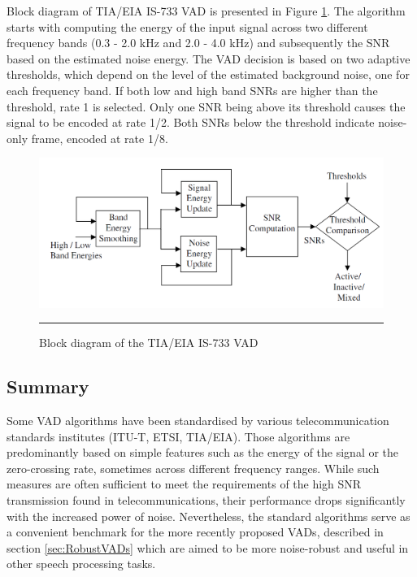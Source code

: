 Block diagram of TIA/EIA IS-733 VAD is presented in Figure \ref{fig:IS733}. The algorithm starts with computing the energy of the input signal across two different frequency bands (0.3 - 2.0 kHz and 2.0 - 4.0 kHz) and subsequently the SNR based on the estimated noise energy. The VAD decision is based on two adaptive thresholds, which depend on the level of the estimated background noise, one for each frequency band. If both low and high band SNRs are higher than the threshold, rate 1 is selected. Only one SNR being above its threshold causes the signal to be encoded at rate 1/2. Both SNRs below the threshold indicate noise-only frame, encoded at rate 1/8.

\begin{figure}[htbp]
	\centering
		\includegraphics[width=0.9\columnwidth]{Figures/IS733.png}
		\rule{37em}{0.5pt}
	\caption[Block diagram of the TIA/EIA IS-733 VAD]{Block diagram of the TIA/EIA IS-733 VAD \cite{Kondoz}}
	\label{fig:IS733}
\end{figure}

\subsection{Summary}

Some VAD algorithms have been standardised by various telecommunication standards institutes (ITU-T, ETSI, TIA/EIA). Those algorithms are predominantly based on simple features such as the energy of the signal or the zero-crossing rate, sometimes across different frequency ranges. While such measures are often sufficient to meet the requirements of the high SNR transmission found in telecommunications, their performance drops significantly with the increased power of noise. Nevertheless, the standard algorithms serve as a convenient benchmark for the more recently proposed VADs, described in section \ref{sec:RobustVADs} which are aimed to be more noise-robust and useful in other speech processing tasks.


